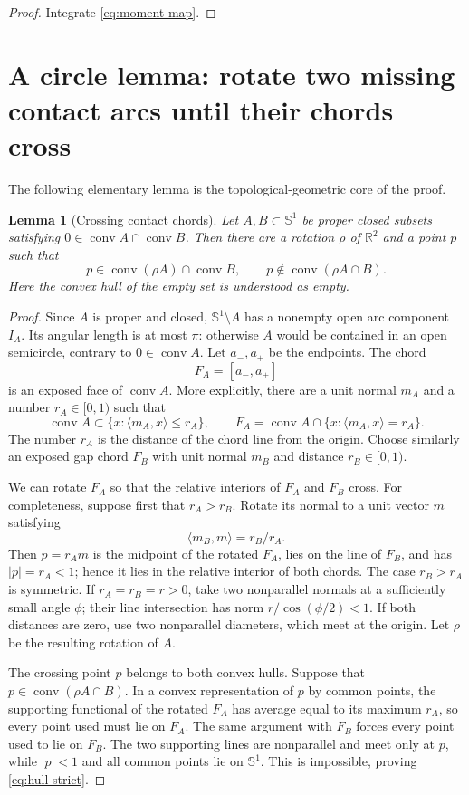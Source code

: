 \documentclass[11pt]{amsart}
\newtheorem{lemma}[theorem]{Lemma}
\theoremstyle{definition}
\theoremstyle{remark}
\newcommand{\R}{\mathbb R}
\newcommand{\Sph}{\mathbb S^1}
\newcommand{\conv}{\operatorname{conv}}
\newcommand{\ip}[2]{\langle #1,#2\rangle}
\begin{document}
\begin{proof}
Integrate \eqref{eq:moment-map}.
\end{proof}

\section{A circle lemma: rotate two missing contact arcs until their chords cross}
\label{sec:circle}

The following elementary lemma is the topological-geometric core of the proof.

\begin{lemma}[Crossing contact chords]\label{lem:chords}
Let $A,B\subset\Sph$ be proper closed subsets satisfying
$0\in\conv A\cap\conv B$.  Then there are a rotation $\rho$ of $\R^2$ and a
point $p$ such that
\begin{equation}\label{eq:hull-strict}
 p\in\conv(\rho A)\cap\conv B,
 \qquad
 p\notin\conv(\rho A\cap B).
\end{equation}
Here the convex hull of the empty set is understood as empty.
\end{lemma}

\begin{proof}
Since $A$ is proper and closed, $\Sph\setminus A$ has a nonempty open arc
component $I_A$.  Its angular length is at most $\pi$: otherwise $A$ would be
contained in an open semicircle, contrary to $0\in\conv A$.  Let $a_-,a_+$ be
the endpoints.  The chord
\[
 F_A=[a_-,a_+]
\]
is an exposed face of $\conv A$.  More explicitly, there are a unit normal
$m_A$ and a number $r_A\in[0,1)$ such that
\[
 \conv A\subset\{x:\ip{m_A}{x}\le r_A\},
 \qquad
 F_A=\conv A\cap\{x:\ip{m_A}{x}=r_A\}.
\]
The number $r_A$ is the distance of the chord line from the origin.  Choose
similarly an exposed gap chord $F_B$ with unit normal $m_B$ and distance
$r_B\in[0,1)$.

We can rotate $F_A$ so that the relative interiors of $F_A$ and $F_B$ cross.
For completeness, suppose first that $r_A>r_B$.  Rotate its normal to a unit
vector $m$ satisfying
\[
 \ip{m_B}{m}=r_B/r_A.
\]
Then $p=r_A m$ is the midpoint of the rotated $F_A$, lies on the line of
$F_B$, and has $|p|=r_A<1$; hence it lies in the relative interior of both
chords.  The case $r_B>r_A$ is symmetric.  If $r_A=r_B=r>0$, take two
nonparallel normals at a sufficiently small angle $\phi$; their line
intersection has norm $r/\cos(\phi/2)<1$.  If both distances are zero, use two
nonparallel diameters, which meet at the origin.  Let $\rho$ be the resulting
rotation of $A$.

The crossing point $p$ belongs to both convex hulls.  Suppose that
$p\in\conv(\rho A\cap B)$.  In a convex representation of $p$ by common
points, the supporting functional of the rotated $F_A$ has average equal to
its maximum $r_A$, so every point used must lie on $F_A$.  The same argument
with $F_B$ forces every point used to lie on $F_B$.  The two supporting lines
are nonparallel and meet only at $p$, while $|p|<1$ and all common points lie
on $\Sph$.  This is impossible, proving \eqref{eq:hull-strict}.
\end{proof}
\end{document}

